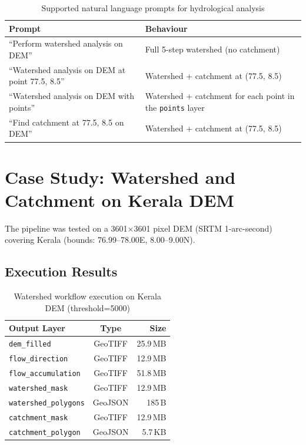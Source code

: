 \begin{table}[ht]
\centering
\caption{Supported natural language prompts for hydrological analysis}
\begin{tabular}{lp{6cm}}
\toprule
\textbf{Prompt} & \textbf{Behaviour} \\
\midrule
``Perform watershed analysis on DEM'' & Full 5-step watershed (no catchment) \\
``Watershed analysis on DEM at point 77.5, 8.5'' & Watershed + catchment at (77.5, 8.5) \\
``Watershed analysis on DEM with points'' & Watershed + catchment for each point in the \texttt{points} layer \\
``Find catchment at 77.5, 8.5 on DEM'' & Watershed + catchment at (77.5, 8.5) \\
\bottomrule
\end{tabular}
\end{table}

\section{Case Study: Watershed and Catchment on Kerala DEM}

The pipeline was tested on a 3601$\times$3601 pixel DEM (SRTM 1-arc-second)
covering Kerala (bounds: 76.99--78.00\textdegree E, 8.00--9.00\textdegree N).

\subsection{Execution Results}

\begin{table}[ht]
\centering
\caption{Watershed workflow execution on Kerala DEM (threshold=5000)}
\begin{tabular}{lcr}
\toprule
\textbf{Output Layer} & \textbf{Type} & \textbf{Size} \\
\midrule
\texttt{dem\_filled}            & GeoTIFF & 25.9\,MB \\
\texttt{flow\_direction}        & GeoTIFF & 12.9\,MB \\
\texttt{flow\_accumulation}     & GeoTIFF & 51.8\,MB \\
\texttt{watershed\_mask}        & GeoTIFF & 12.9\,MB \\
\texttt{watershed\_polygons}    & GeoJSON & 185\,B \\
\texttt{catchment\_mask}        & GeoTIFF & 12.9\,MB \\
\texttt{catchment\_polygon}     & GeoJSON & 5.7\,KB \\
\bottomrule
\end{tabular}
\end{table}

